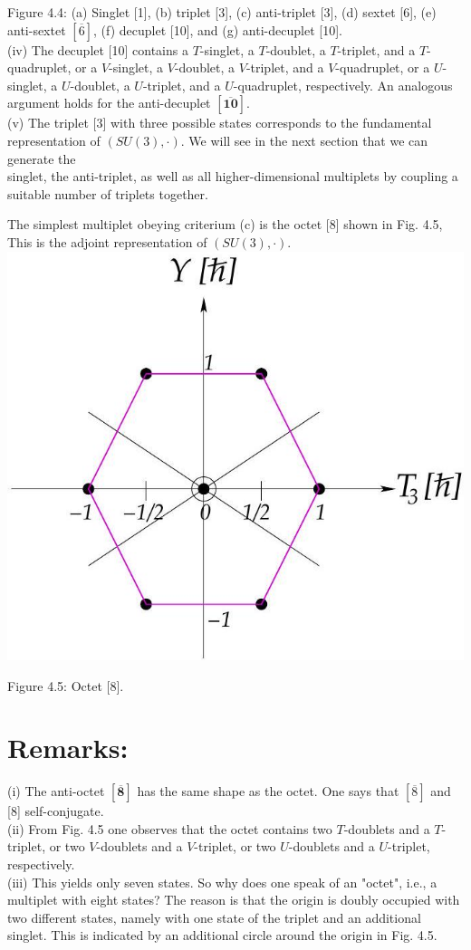 \documentclass[10pt, letterpaper]{article}
\begin{document}
Figure 4.4: (a) Singlet [1], (b) triplet [3], (c) anti-triplet [3], (d) sextet [6], (e) anti-sextet $[\overline{6}]$, (f) decuplet [10], and (g) anti-decuplet [10].\\[0pt]
(iv) The decuplet [10] contains a $T$-singlet, a $T$-doublet, a $T$-triplet, and a $T$-quadruplet, or a $V$-singlet, a $V$-doublet, a $V$-triplet, and a $V$-quadruplet, or a $U$-singlet, a $U$-doublet, a $U$-triplet, and a $U$-quadruplet, respectively. An analogous argument holds for the anti-decuplet $[\overline{\mathbf{1 0}}]$.\\[0pt]
(v) The triplet [3] with three possible states corresponds to the fundamental representation of $(S U(3), \cdot)$. We will see in the next section that we can generate the\\
singlet, the anti-triplet, as well as all higher-dimensional multiplets by coupling a suitable number of triplets together.

The simplest multiplet obeying criterium (c) is the octet [8] shown in Fig. 4.5, This is the adjoint representation of $(S U(3), \cdot)$.\\
\includegraphics[scale=0.3, center]{2025_05_20_8618f55a41bfe980b4b2g-50}

Figure 4.5: Octet [8].

\section{Remarks:}
(i) The anti-octet $[\overline{\boldsymbol{8}}]$ has the same shape as the octet. One says that $[\overline{8}]$ and [8] self-conjugate.\\
(ii) From Fig. 4.5 one observes that the octet contains two $T$-doublets and a $T$-triplet, or two $V$-doublets and a $V$-triplet, or two $U$-doublets and a $U$-triplet, respectively.\\
(iii) This yields only seven states. So why does one speak of an "octet", i.e., a multiplet with eight states? The reason is that the origin is doubly occupied with two different states, namely with one state of the triplet and an additional singlet. This is indicated by an additional circle around the origin in Fig. 4.5.
\end{document}
